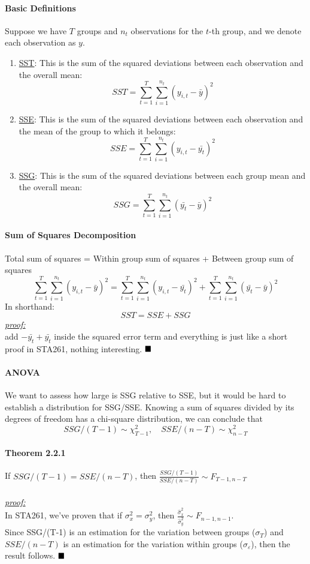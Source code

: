 \documentclass[11pt]{article}
\newcommand{\under}[1]{\underline{#1}}
\newcommand{\proof}[0]{\textit{\underline{proof:} }}
\newcommand{\qed}[0]{$\hfill\blacksquare$}
\begin{document}
\paragraph{Basic Definitions}
Suppose we have $T$ groups and $n_t$ observations for the $t$-th group, and we denote each observation as $y$.
\begin{enumerate}
	\item \under{SST}: This is the sum of the squared deviations between each observation and the overall mean:
	$$SST = \sum_{t=1}^T\sum_{i=1}^{n_t}(y_{i,t}-\bar{y})^2$$
	\item \under{SSE}: This is the sum of the squared deviations between each observation and the mean of the group to which it belongs:
	$$SSE = \sum_{t=1}^T\sum_{i=1}^{n_t}(y_{i,t}-\bar{y_t})^2$$
	\item \under{SSG}: This is the sum of the squared deviations between each group mean and the overall mean:
	$$SSG = \sum_{t=1}^T\sum_{i=1}^{n_t}(\bar{y_t}-\bar{y})^2$$
\end{enumerate}

\paragraph{Sum of Squares Decomposition}
Total sum of squares = Within group sum of squares + Between group sum of squares \\
$$\sum_{t=1}^T\sum_{i=1}^{n_t}(y_{i,t}-\bar{y})^2 = \sum_{t=1}^T\sum_{i=1}^{n_t}(y_{i,t}-\bar{y_t})^2 + \sum_{t=1}^T\sum_{i=1}^{n_t}(\bar{y_t}-\bar{y})^2$$
In shorthand:
$$SST = SSE + SSG$$
\proof\\
add $-\bar{y_t}+\bar{y_t}$ inside the squared error term and everything is just like a short proof in STA261, nothing interesting. \qed
\paragraph{ANOVA}
We want to assess how large is SSG relative to SSE, but it would be hard to establish a distribution for SSG/SSE. Knowing a sum of squares divided by its degrees of freedom has a chi-square distribution, we can conclude that
$$SSG/(T-1) \sim \chi_{T-1}^2, \quad SSE/(n-T) \sim \chi_{n-T}^2$$
\paragraph{Theorem 2.2.1} If $SSG/(T-1) = SSE/(n-T)$, then $\frac{SSG/(T-1)}{SSE/(n-T)} \sim F_{T-1, n-T}$ \\\\
\proof \\
In STA261, we've proven that if $\sigma_x^2 = \sigma_y^2$, then $\frac{\hat{\sigma}_x^2}{\hat{\sigma}_y^2} \sim F_{n-1,n-1}$.\\ Since SSG/(T-1) is an estimation for the variation between groups ($\sigma_T$) and $SSE/(n-T)$ is an estimation for the variation within groups ($\sigma_\varepsilon$), then the result follows. \qed
\end{document}
